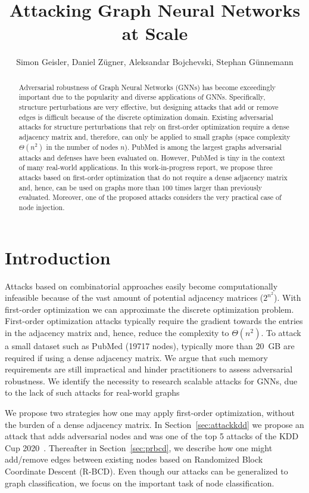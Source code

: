 \documentclass[letterpaper]{article} %
\title{Attacking Graph Neural Networks at Scale}
\author {
    Simon Geisler,
    Daniel Z\"ugner,
    Aleksandar Bojchevski,
    Stephan G\"unnemann \\
}
\begin{document}
\maketitle

\begin{abstract}
Adversarial robustness of Graph Neural Networks (GNNs) has become exceedingly important due to the popularity and diverse applications of GNNs. Specifically, structure perturbations are very effective, but designing attacks that add or remove edges is difficult because of the discrete optimization domain. Existing adversarial attacks for structure perturbations that rely on first-order optimization require a dense adjacency matrix and, therefore, can only be applied to small graphs (space complexity \(\Theta(n^2)\) in the number of nodes \(n\)). PubMed is among the largest graphs adversarial attacks and defenses have been evaluated on. However, PubMed is tiny in the context of many real-world applications. In this work-in-progress report, we propose three attacks based on first-order optimization that do not require a dense adjacency matrix and, hence, can be used on graphs more than 100 times larger than previously evaluated. Moreover, one of the proposed attacks considers the very practical case of node injection.
\end{abstract}

\noindent \section{Introduction} %

Attacks based on combinatorial approaches easily become computationally infeasible because of the vast amount of potential adjacency matrices (\(2^{n^2}\)). With first-order optimization we can approximate the discrete optimization problem. First-order optimization attacks typically require the gradient towards the entries in the adjacency matrix and, hence, reduce the complexity to \(\Theta(n^2)\). To attack a small dataset such as PubMed (19717 nodes), typically more than 20~GB are required if using a dense adjacency matrix. We argue that such memory requirements are still impractical and hinder practitioners to assess adversarial robustness. We identify the necessity to research scalable attacks for GNNs, due to the lack of such attacks for real-world graphs

We propose two strategies how one may apply first-order optimization, without the burden of a dense adjacency matrix. In Section~\ref{sec:attackkdd} we propose an attack that adds adversarial nodes and was one of the top 5 attacks of the KDD Cup 2020~\citep{Biendata2020}. Thereafter in Section~\ref{sec:prbcd}, we describe how one might add/remove edges between existing nodes based on Randomized Block Coordinate Descent (R-BCD). Even though our attacks can be generalized to graph classification, we focus on the important task of node classification.
\end{document}
